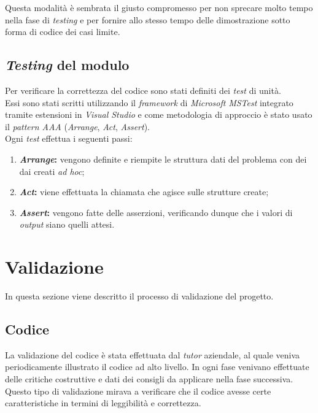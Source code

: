 \noindent Questa modalità è sembrata il giusto compromesso per non sprecare molto tempo nella
fase di \textit{testing} e per fornire allo stesso tempo delle dimostrazione sotto forma di
codice dei casi limite.

\subsection{\textit{Testing} del modulo}
\noindent Per verificare la correttezza del codice sono stati definiti dei \textit{test} di unità.\\
Essi sono stati scritti utilizzando il \textit{framework} di \textit{Microsoft} \textit{MSTest} integrato tramite estensioni
in \textit{Visual Studio} e come metodologia di approccio è stato usato il \textit{pattern AAA} (\textit{Arrange}, \textit{Act}, \textit{Assert}).\\
Ogni \textit{test} effettua i seguenti passi:
\begin{enumerate}
    \item \textbf{\textit{Arrange}:} vengono definite e riempite le struttura dati del problema con dei
    dai creati \textit{ad hoc};
    \item \textbf{\textit{Act}:} viene effettuata la chiamata che agisce sulle strutture create;
    \item \textbf{\textit{Assert}:} vengono fatte delle asserzioni, verificando dunque che i valori di \textit{output} 
    siano quelli attesi.
\end{enumerate}





\section{Validazione}
\noindent In questa sezione viene descritto il processo di validazione del progetto.
\subsection{Codice}
\noindent La validazione del codice è stata effettuata dal \textit{\textit{tutor}} aziendale,
al quale veniva periodicamente illustrato il codice ad alto livello.
In ogni fase venivano effettuate delle critiche costruttive e dati dei consigli
da applicare nella fase successiva. Questo tipo di validazione mirava a verificare che il codice avesse certe caratteristiche in termini di leggibilità e correttezza.
